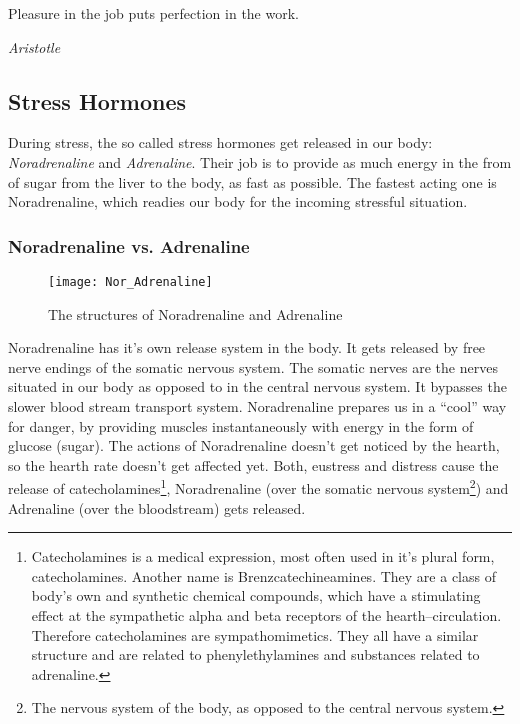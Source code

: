 \documentclass[../Book.Stress_regulation.tex]{subfiles}
\begin{document}
\epigraph{Pleasure in the job puts perfection in the work.}{\textit{Aristotle}}

\subsection{Stress Hormones}


During stress, the so called stress hormones get released in our body: \emph{Noradrenaline} and \emph{Adrenaline}.
Their job is to provide as much {energy} in the from of sugar from the liver to the body, as fast as possible.
The fastest acting one is Noradrenaline, which readies our body for the incoming stressful situation.




\subsubsection{Noradrenaline vs. Adrenaline}

\begin{figure}[htb]
\texttt{[image: Nor\_Adrenaline]}
\caption{The structures of Noradrenaline and Adrenaline}
\end{figure}

Noradrenaline has it's {own release system} in the body. It gets released by free nerve endings of the somatic nervous system.
The somatic nerves are the nerves situated in our body as opposed to in the central nervous system.
It bypasses the slower blood stream transport system. Noradrenaline prepares us in a {``cool'' way} for danger, by providing muscles instantaneously with energy in the form of glucose (sugar).
The actions of Noradrenaline doesn't get noticed by the hearth, so the hearth rate doesn't get affected yet.
Both, eustress and distress cause the release of catecholamines\footnote{Catecholamines is a medical expression, most often used in it's plural form, catecholamines. Another name is Brenzcatechineamines. They are a class of body's own and synthetic chemical compounds, which have a stimulating effect at the sympathetic alpha and beta receptors of the hearth--circulation. Therefore catecholamines are sympathomimetics. They all have a similar structure and are related to phenylethylamines and substances related to adrenaline.}, Noradrenaline (over the somatic nervous system\footnote{The nervous system of the body, as opposed to the central nervous system.}) and Adrenaline (over the bloodstream) gets released.
\end{document}
